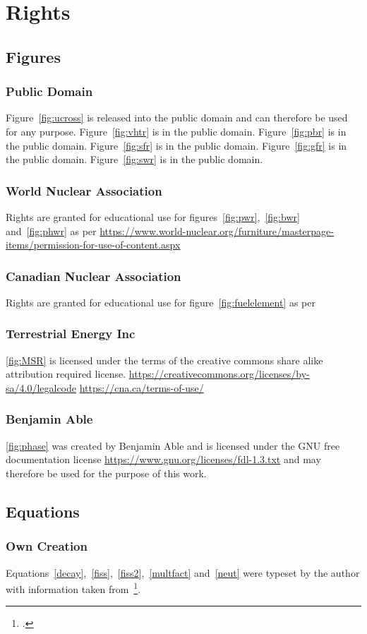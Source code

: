 \chapter{Rights}
\section{Figures}
\subsection{Public Domain}
Figure~\ref{fig:ucross} is released into the public domain and can therefore be used for any purpose.
Figure~\ref{fig:vhtr} is in the public domain.
Figure~\ref{fig:pbr} is in the public domain.
Figure~\ref{fig:sfr} is in the public domain.
Figure~\ref{fig:gfr} is in the public domain.
Figure~\ref{fig:swr} is in the public domain.
\subsection{World Nuclear Association}
Rights are granted for educational use for figures~\ref{fig:pwr},~\ref{fig:bwr} and~\ref{fig:phwr}
as per \url{https://www.world-nuclear.org/furniture/masterpage-items/permission-for-use-of-content.aspx}
\subsection{Canadian Nuclear Association}
Rights are granted for educational use for figure~\ref{fig:fuelelement} as per
\subsection{Terrestrial Energy Inc}
\ref{fig:MSR} is licensed under the terms of the creative commons share alike attribution required
license. \url{https://creativecommons.org/licenses/by-sa/4.0/legalcode}
\url{https://cna.ca/terms-of-use/}
\subsection{Benjamin Able}
\ref{fig:phase} was created by Benjamin Able and is licensed under the GNU free documentation license
\url{https://www.gnu.org/licenses/fdl-1.3.txt} and may therefore be used for the purpose of this
work.
\section{Equations}
\subsection{Own Creation}
Equations~\ref{decay},~\ref{fiss},~\ref{fiss2},~\ref{multfact} and~\ref{neut} were typeset by the author with
information taken from~\footcite{ReactorDesign}.
